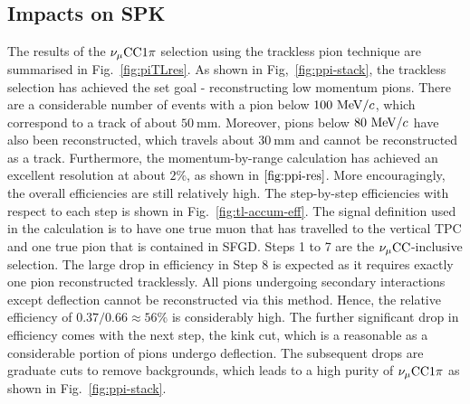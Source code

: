      \subsection{Impacts on SPK}
          The results of the $\nu_{\mu}\textrm{CC}1\pi$ selection using the trackless pion technique are summarised in Fig.~\ref{fig:piTLres}.
          As shown in Fig,~\ref{fig:ppi-stack}, the trackless selection has achieved the set goal - reconstructing low momentum pions. 
          There are a considerable number of events with a pion below $100~\textrm{MeV}/c$, which correspond to a track of about $50~\textrm{mm}$. 
          Moreover, pions below $80~\textrm{MeV}/c$ have also been reconstructed, which travels about $30~\textrm{mm}$ and cannot be reconstructed as a track. 
          Furthermore, the momentum-by-range calculation has achieved an excellent resolution at about $2\%$, as shown in $\ref{fig:ppi-res}$.
          More encouragingly, the overall efficiencies are still relatively high. 
          The step-by-step efficiencies with respect to each step is shown in Fig.~\ref{fig:tl-accum-eff}. 
          The signal definition used in the calculation is to have one true muon that has travelled to the vertical TPC and one true pion that is contained in SFGD. 
          Steps 1 to 7 are the $\nu_{\mu}\textrm{CC}$-inclusive selection. 
          The large drop in efficiency in Step 8 is expected as it requires exactly one pion reconstructed tracklessly. 
          All pions undergoing secondary interactions except deflection cannot be reconstructed via this method. 
          Hence, the relative efficiency of $0.37/0.66\approx56\%$ is considerably high. 
          The further significant drop in efficiency comes with the next step, the kink cut, which is a reasonable as a considerable portion of pions undergo deflection. 
          The subsequent drops are graduate cuts to remove backgrounds, which leads to a high purity of $\nu_{\mu}\textrm{CC}1\pi$ as shown in Fig.~\ref{fig:ppi-stack}.

